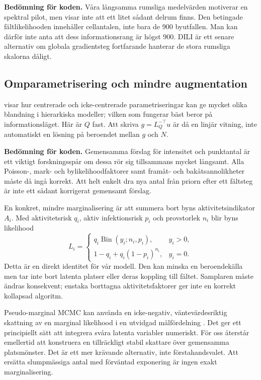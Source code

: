 \documentclass[11pt,a4paper]{article}
\begin{document}
\textbf{Bedömning för koden.} Våra långsamma rumsliga medelvärden motiverar en spektral pilot, men visar inte att ett litet sådant delrum finns. Den betingade fältlikelihooden innehåller cellantalen, inte bara de 900 byutfallen. Man kan därför inte anta att dess informationsrang är högst 900. DILI är ett senare alternativ om globala gradientsteg fortfarande hanterar de stora rumsliga skalorna dåligt.

\subsection{Omparametrisering och mindre augmentation}

\citet{papaspiliopoulos2007parametrization} visar hur centrerade och icke-centrerade parametriseringar kan ge mycket olika blandning i hierarkiska modeller; vilken som fungerar bäst beror på informationsläget. Här är $Q$ fast. Att skriva $g=L_Q^{-\top}u$ är då en linjär vitning, inte automatiskt en lösning på beroendet mellan $g$ och $N$.

\textbf{Bedömning för koden.} Gemensamma förslag för intensitet och punktantal är ett viktigt forskningsspår om dessa rör sig tillsammans mycket långsamt. Alla Poisson-, mark- och bylikelihoodfaktorer samt framåt- och bakåtsannolikheter måste då ingå korrekt. Att helt enkelt dra nya antal från priorn efter ett fältsteg är inte ett sådant korrigerat gemensamt förslag.

En konkret, mindre marginalisering är att summera bort byns aktivitetsindikator $A_i$. Med aktivitetsrisk $q_i$, aktiv infektionsrisk $p_i$ och provstorlek $n_i$ blir byns likelihood
\[
 L_i=
 \begin{cases}
 q_i\operatorname{Bin}(y_i;n_i,p_i),&y_i>0,\\
 1-q_i+q_i(1-p_i)^{n_i},&y_i=0.
 \end{cases}
\]
Detta är en direkt identitet för vår modell. Den kan minska en beroendekälla men tar inte bort latenta platser eller deras koppling till fältet. Samplaren måste ändras konsekvent; enstaka borttagna aktivitetsfaktorer ger inte en korrekt kollapsad algoritm.

Pseudo-marginal MCMC kan använda en icke-negativ, väntevärdesriktig skattning av en marginal likelihood i en utvidgad målfördelning \citep{andrieu2009pseudo}. Det ger ett principiellt sätt att integrera svåra latenta variabler numeriskt. För oss återstår emellertid att konstruera en tillräckligt stabil skattare över gemensamma platsmönster. Det är ett mer krävande alternativ, inte förstahandsvalet. Att ersätta slumpmässiga antal med förväntad exponering är ingen exakt marginalisering.
\end{document}
